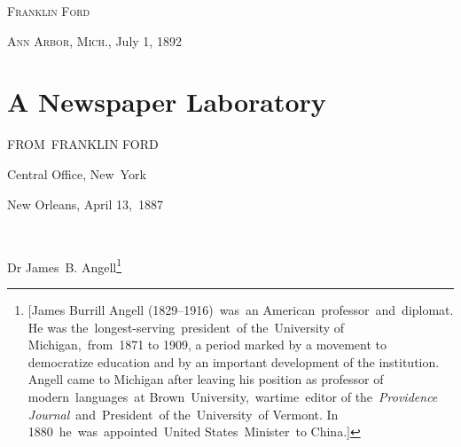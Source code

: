 \documentclass[twoside,symmetric,nobib,justified]{tufte-book}
\let\oldchapter\chapter
\def\chapter{%
  \setcounter{footnote}{0}%
  \oldchapter
}
\begin{document}
\vspace{.2in}

\begin{LARGE}
    


\hfill \textsc{Franklin Ford}


\end{LARGE}

\vspace{.1in}

\textsc{Ann Arbor, Mich.}, July 1, 1892













\chapter[A Newspaper Laboratory]{A Newspaper Laboratory}
\label{ch:A Newspaper Laboratory}

\vspace{.2in}

\begin{LARGE}
    

\end{LARGE}

\vspace{0.5in}

\begin{center}
    

\Large{FROM~FRANKLIN FORD~}

\end{center}
\vspace{.1in}

\noindent Central Office, New~York~

\vspace{.1in}

\begin{center}

New Orleans, April 13,~1887~
\end{center}

~

\noindent Dr James~B. Angell\footnote{{[}James Burrill Angell (1829--1916)~was~an
  American~professor~and~diplomat. He was
  the~longest-serving~president~of the~University of Michigan,~from~1871
  to 1909, a period marked by a movement to democratize education and by
  an important development of the institution. Angell came to Michigan
  after leaving his position as professor of modern~languages~at
  Brown~University,~wartime~editor of the~\emph{Providence
  Journal}~and~President~of the~University~of Vermont. In
  1880~he~was~appointed~United States~Minister~to China.{]}}~
\end{document}
